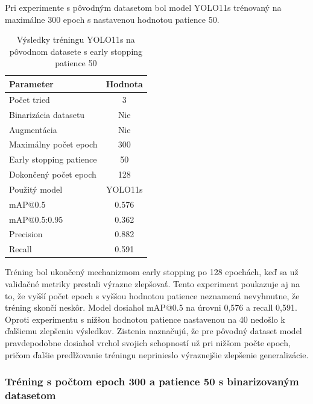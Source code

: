                 Pri experimente s pôvodným datasetom bol model YOLO11s trénovaný na maximálne 300 epoch s nastavenou hodnotou patience 50.

                \begin{table}[H]
                    \centering
                    \begin{tabular}{|l|c|}
                    \hline
                    \textbf{Parameter} & \textbf{Hodnota} \\ \hline
                    Počet tried & 3 \\ \hline
                    Binarizácia datasetu & Nie \\ \hline
                    Augmentácia & Nie \\ \hline
                    Maximálny počet epoch & 300 \\ \hline
                    Early stopping patience & 50 \\ \hline
                    Dokončený počet epoch & 128 \\ \hline
                    Použitý model & YOLO11s \\ \hline
                    mAP@0.5 & 0.576 \\ \hline
                    mAP@0.5:0.95 & 0.362 \\ \hline
                    Precision & 0.882 \\ \hline
                    Recall & 0.591 \\ \hline
                    \end{tabular}
                    \caption{Výsledky tréningu YOLO11s na pôvodnom datasete s early stopping patience 50}
                    \label{tab:yolo11s_default_earlystop_p50}
                \end{table}

                Tréning bol ukončený mechanizmom early stopping po 128 epochách, keď sa už validačné metriky prestali výrazne zlepšovať. Tento experiment poukazuje aj na to, že vyšší počet epoch s vyššou hodnotou patience neznamená nevyhnutne, že tréning skončí neskôr. Model dosiahol mAP@0.5 na úrovni 0,576 a recall 0,591. Oproti experimentu s nižšou hodnotou patience nastavenou na 40 nedošlo k ďalšiemu zlepšeniu výsledkov. Zistenia naznačujú, že pre pôvodný dataset model pravdepodobne dosiahol vrchol svojich schopností už pri nižšom počte epoch, pričom ďalšie predlžovanie tréningu neprinieslo výraznejšie zlepšenie generalizácie.

                \subsubsection{Tréning s počtom epoch 300 a patience 50 s binarizovaným datasetom}

